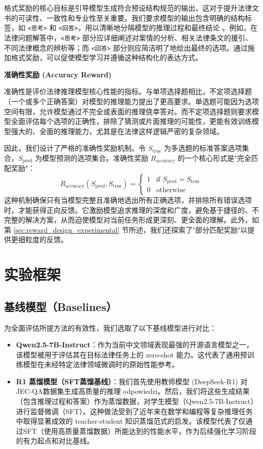 \documentclass{pkuthesis}
\newcommand{\qwen}{Qwen2.5-7B-Instruct}
\newcommand{\deepseekr}{DeepSeek-R1}
\begin{document}
格式奖励的核心目标是引导模型生成符合预设结构规范的输出，这对于提升法律文书的可读性、一致性和专业性至关重要。我们要求模型的输出包含明确的结构标签，如 \texttt{<思考>} 和 \texttt{<回答>}，用以清晰地分隔模型的推理过程和最终结论 \cite{guo2025deepseek}。例如，在法律问题解答中，\texttt{<思考>} 部分应详细阐述对案情的分析、相关法律条文的援引、不同法律概念的辨析等；而 \texttt{<回答>} 部分则应简洁明了地给出最终的选项。通过施加格式奖励，可以促使模型学习并遵循这种结构化的表达方式。

\textbf{准确性奖励 (Accuracy Reward)}

准确性是评价法律推理模型核心性能的指标。与单项选择题相比，不定项选择题（一个或多个正确答案）对模型的推理能力提出了更高要求。单选题可能因为选项空间有限，允许模型通过不完全或表面的推理侥幸答对。而不定项选择题则要求模型全面评估每个选项的正确性，排除了猜测或片面推理的可能性，更能有效训练模型强大的、全面的推理能力，尤其是在法律这样逻辑严密的复杂领域。

因此，我们设计了严格的准确性奖励机制。令 $S_{\text{true}}$ 为多选题的标准答案选项集合，$S_{\text{pred}}$ 为模型预测的选项集合。准确性奖励 $R_{\text{accuracy}}$ 的一个核心形式是"完全匹配奖励"：
$$ R_{\text{accuracy}}(S_{\text{pred}}, S_{\text{true}}) = \begin{cases} 1 & \text{if } S_{\text{pred}} = S_{\text{true}} \\ 0 & \text{otherwise} \end{cases} $$
这种机制确保只有当模型完整且准确地选出所有正确选项，并排除所有错误选项时，才能获得正向反馈。它激励模型追求推理的深度和广度，避免基于捷径的、不完整的解决方案，从而迫使模型对当前任务形成更深刻、更全面的理解。此外，如第 \ref{sec:reward_design_experimental} 节所述，我们还探索了"部分匹配奖励"以提供更细粒度的反馈。


\section{实验框架}


\subsection{基线模型（Baselines）}

为全面评估所提方法的有效性，我们选取了以下基线模型进行对比：
\begin{itemize}
\item \textbf{\qwen}：作为当前中文领域表现最强的开源语言模型之一\cite{yang2024qwen2}，该模型被用于评估其在目标法律任务上的 zero-shot 能力。这代表了通用预训练模型在未经特定法律领域微调时的原始性能参考。
\item \textbf{R1 蒸馏模型（SFT蒸馏基线）}：我们首先使用教师模型 (\deepseekr) 对JEC-QA数据集生成高质量的推理 odpowiedzi。然后，我们将这些生成结果（包含推理过程和答案）作为蒸馏数据，对学生模型（\qwen）进行监督微调（SFT）。这种做法受到了近年来在数学和编程等复杂推理任务中取得显著成效的 teacher-student 知识蒸馏范式的启发\cite{guo2025deepseek}。该模型代表了仅通过SFT（使用高质量蒸馏数据）所能达到的性能水平，作为后续强化学习阶段的有力起点和对比基线。

\end{itemize}
\end{document}
